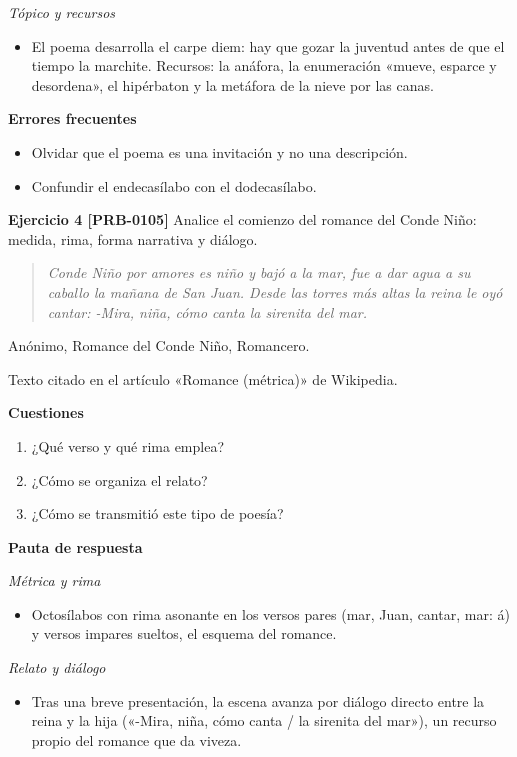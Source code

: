 \documentclass{book}
\begin{document}
\noindent\textit{Tópico y recursos}
\begin{itemize}
\item El poema desarrolla el carpe diem: hay que gozar la juventud antes de que el tiempo la marchite. Recursos: la anáfora, la enumeración «mueve, esparce y desordena», el hipérbaton y la metáfora de la nieve por las canas.
\end{itemize}

\noindent\textbf{Errores frecuentes}
\begin{itemize}
\item Olvidar que el poema es una invitación y no una descripción.
\item Confundir el endecasílabo con el dodecasílabo.
\end{itemize}

\noindent\textbf{Ejercicio 4 [PRB-0105]}
Analice el comienzo del romance del Conde Niño: medida, rima, forma narrativa y diálogo.


\begin{quote}
\itshape Conde Niño por amores es niño y bajó a la mar, fue a dar agua a su caballo la mañana de San Juan. Desde las torres más altas la reina le oyó cantar: -Mira, niña, cómo canta la sirenita del mar.
\end{quote}
{\noindent\footnotesize Anónimo, Romance del Conde Niño, Romancero.\par}
{\noindent\footnotesize Texto citado en el artículo «Romance (métrica)» de Wikipedia.\par}

\noindent\textbf{Cuestiones}
\begin{enumerate}
\item ¿Qué verso y qué rima emplea?
\item ¿Cómo se organiza el relato?
\item ¿Cómo se transmitió este tipo de poesía?
\end{enumerate}

\noindent\textbf{Pauta de respuesta}

\noindent\textit{Métrica y rima}
\begin{itemize}
\item Octosílabos con rima asonante en los versos pares (mar, Juan, cantar, mar: á) y versos impares sueltos, el esquema del romance.
\end{itemize}

\noindent\textit{Relato y diálogo}
\begin{itemize}
\item Tras una breve presentación, la escena avanza por diálogo directo entre la reina y la hija («-Mira, niña, cómo canta / la sirenita del mar»), un recurso propio del romance que da viveza.
\end{itemize}
\end{document}
